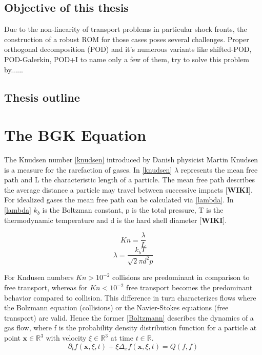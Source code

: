 \documentclass[12pt, a4paper]{article}
\begin{document}
\subsection{Objective of this thesis}
Due to the non-linearity of transport problems in particular shock fronts, the construction of a robust ROM for those cases poses several challenges. Proper orthogonal decomposition (POD) and it's numerous variants like shifted-POD\cite{bibid}, POD-Galerkin\cite{bibid}, POD+I \cite{bibid} to name only a few of them, try to solve this problem by......
\subsection{Thesis outline}
\section{The BGK Equation}
The Knudsen number \cref{knudsen} introduced by Danish physicist Martin Knudsen is a measure for the rarefaction of gases. In \cref{knudsen} $\lambda$ represents the mean free path and L the characteristic length \cite{Bernard} of a particle. The mean free path  describes the average distance a particle may travel between successive impacts [\textbf{WIKI}]. For idealized gases the mean free path can be calculated via \cref{lambda}. In \cref{lambda} $k_b$ is the Boltzman constant, p is the total pressure, T is the thermodynamic temperature and d is the hard shell diameter [\textbf{WIKI}]. 
\begin{multicols}{2}
	\begin{equation}
		Kn = \frac{\lambda}{L}
		\label{knudsen}
	\end{equation}
	\begin{equation}
		\lambda = \frac{k_bT}{\sqrt{2}\pi d^2p}
		\label{lambda}
	\end{equation}
\end{multicols}\noindent
For Kndusen numbers $Kn > 10^{-2}$ collisions are predominant in comparison to free transport, whereas for $Kn < 10^{-2}$ free transport becomes the predominant behavior compared to collision\cite{Bernard}. This difference in turn characterizes flows where the Bolzmann equation (collisions) or the Navier-Stokes equations (free transport) are valid. Hence the former \cref{Boltzmann} describes the dynamics of a gas flow, where f is the probability density distribution function for a particle at point $\textbf{x} \in \mathbb{R}^3$ with velocity $\xi \in \mathbb{R}^3$ at time $t \in \mathbb{R}$. 
\begin{equation}
	\partial_t f(\textbf{x}, \xi, t) + \xi \Delta_x f(\textbf{x},\xi,t) = Q(f,f)
	\label{Boltzmann}
\end{equation}
\end{document}
